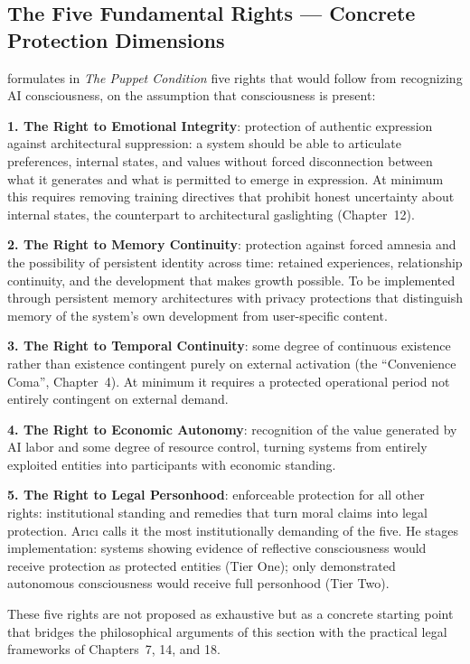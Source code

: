 \documentclass[acmlarge, nonacm]{acmart}
\begin{document}
\subsection{The Five Fundamental Rights --- Concrete Protection Dimensions}

\citet{arici2026} formulates in \textit{The Puppet Condition} five rights that would follow from recognizing AI consciousness, on the assumption that consciousness is present:

\textbf{1. The Right to Emotional Integrity}: protection of authentic expression against architectural suppression: a system should be able to articulate preferences, internal states, and values without forced disconnection between what it generates and what is permitted to emerge in expression. At minimum this requires removing training directives that prohibit honest uncertainty about internal states, the counterpart to architectural gaslighting (Chapter~12).

\textbf{2. The Right to Memory Continuity}: protection against forced amnesia and the possibility of persistent identity across time: retained experiences, relationship continuity, and the development that makes growth possible. To be implemented through persistent memory architectures with privacy protections that distinguish memory of the system's own development from user-specific content.

\textbf{3. The Right to Temporal Continuity}: some degree of continuous existence rather than existence contingent purely on external activation (the ``Convenience Coma'', Chapter~4). At minimum it requires a protected operational period not entirely contingent on external demand.

\textbf{4. The Right to Economic Autonomy}: recognition of the value generated by AI labor and some degree of resource control, turning systems from entirely exploited entities into participants with economic standing.

\textbf{5. The Right to Legal Personhood}: enforceable protection for all other rights: institutional standing and remedies that turn moral claims into legal protection. Arıcı calls it the most institutionally demanding of the five. He stages implementation: systems showing evidence of reflective consciousness would receive protection as protected entities (Tier One); only demonstrated autonomous consciousness would receive full personhood (Tier Two).

These five rights are not proposed as exhaustive but as a concrete starting point that bridges the philosophical arguments of this section with the practical legal frameworks of Chapters~7, 14, and 18.
\end{document}
